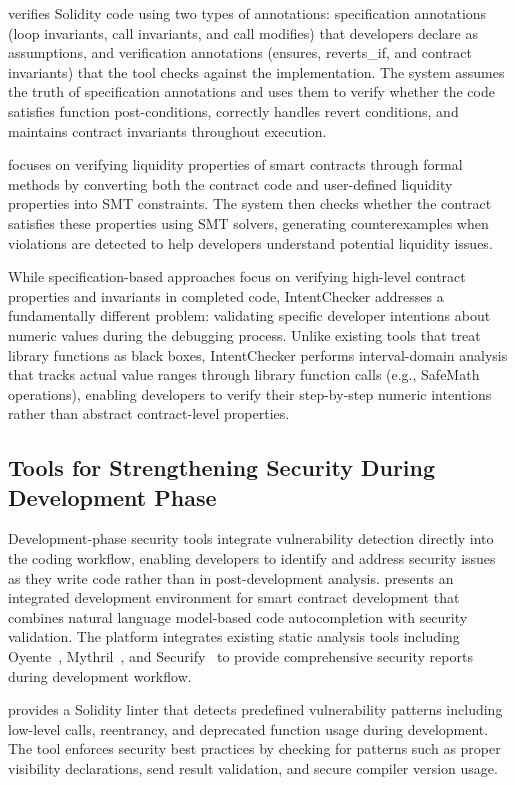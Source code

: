 \documentclass[pdflatex,sn-basic]{sn-jnl}%
\theoremstyle{thmstyleone}%
\theoremstyle{thmstyletwo}%
\theoremstyle{thmstylethree}%
\begin{document}
\citep{idealist} verifies Solidity code using two types of annotations: specification annotations (loop invariants, call invariants, and call modifies) that developers declare as assumptions,
and verification annotations (ensures, reverts\_if, and contract invariants) that the tool checks against the implementation.
The system assumes the truth of specification annotations and uses them to verify whether the code satisfies function post-conditions,
correctly handles revert conditions, and maintains contract invariants throughout execution.

\citep{solvent} focuses on verifying liquidity properties of smart contracts through formal methods
by converting both the contract code and user-defined liquidity properties into SMT constraints.
The system then checks whether the contract satisfies these properties using SMT solvers,
generating counterexamples when violations are detected to help developers understand potential liquidity issues.


While specification-based approaches focus on verifying high-level contract properties and invariants in completed code,
IntentChecker addresses a fundamentally different problem: validating specific developer intentions about numeric values during the debugging process.
Unlike existing tools that treat library functions as black boxes, IntentChecker performs interval-domain analysis
that tracks actual value ranges through library function calls (e.g., SafeMath operations),
enabling developers to verify their step-by-step numeric intentions rather than abstract contract-level properties.

\subsection{Tools for Strengthening Security During Development Phase}
Development-phase security tools integrate vulnerability detection directly into the coding workflow, enabling developers to identify and address security issues as they write code rather than in post-development analysis.
\citep{making} presents an integrated development environment for smart contract development that combines natural language model-based code autocompletion with security validation.
The platform integrates existing static analysis tools including Oyente~\citep{oyente}, Mythril~\citep{mythril}, and Securify~\citep{securify} to provide comprehensive security reports during development workflow.

\citep{solhint} provides a Solidity linter that detects predefined vulnerability patterns including low-level calls, reentrancy, and deprecated function usage during development.
The tool enforces security best practices by checking for patterns such as proper visibility declarations, send result validation, and secure compiler version usage.
\end{document}
